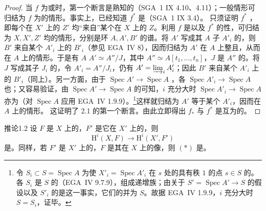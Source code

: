 \begin{proof}
当 $f$ 为或时，第一个断言是熟知的（SGA~1 IX 4.10、4.11）；一般情形可归结为 $f$ 为的情形。事实上，已经知道 $f^*$ 是（SGA~1 IX 3.4）。
只须证明 $f^*$ ，即每个在 $X'$ 上的 $Z'$ 均“来自”某个在 $X$ 上的 $Z$。利用 $f$ 是以及 $f^*$ 的性，可归结为 $X,X',Z'$ 均的情形，分别是环 $A,A',B'$ 的谱。将 $A'$ 写成其 $A$ 子 $A'_i$ 的，则 $B'$ 来自某个 $A'_i$ 上的 $B'_i$（参见 EGA~IV 8），因而归结为 $A'$ 在 $A$ 上整且，从而在 $A$ 上的情形。于是有 $A$  $A'\simeq A''/J$，其中 $A''\simeq A[t_1,\ldots,t_n]$，$J$ 是 $A''$ 的。将 $J$ 写成其子 $J_i$ 的，令 $A'_i=A''/J_i$，仍有 $A'=\varinjlim_i A'_i$；因此 $B'$ 来自某个 $A'_i$ 上的 $B'_i$（同上）。另一方面，由于 $\operatorname{Spec}A'\to\operatorname{Spec}A$ ，各 $\operatorname{Spec}A'_i\to\operatorname{Spec}A$ 也；又容易验证，由 $\operatorname{Spec}A'\to\operatorname{Spec}A$ 的可知，$i$ 充分大时 $\operatorname{Spec}A'_i\to\operatorname{Spec}A$ 亦为（对 $\operatorname{Spec}A$ 应用 EGA~IV 1.9.9）。\footnote{令 $S_i\subset S=\operatorname{Spec}A$ 为使 $X'_i=\operatorname{Spec}A'_i$ 在 $s$ 处的具有秩 $1$ 的点 $s\in S$ 的。各 $S_i$ 是 $S$ 的（EGA~IV 9.7.9），组成递增族；由关于 $S'=\operatorname{Spec}A'\to S$ 的假设以及 $S'_i$ 的是这一事实，它们的并为 $S$。故据 EGA~IV 1.9.9，$i$ 充分大时 $S=S_i$，证毕。}这样就归结为 $A'$ 等于某个 $A'_i$，因而在 $A$ 上的情形。
这证明了 2.1 的第一个断言。由此立即得出 $f_*$ 与 $f^*$ 是互为的。
\end{proof}
\begin{SGAresult}{推论}{1.2}
设 $F$ 是 $X$ 上的，$F'$ 是它在 $X'$ 上的，则
\[\mathrm H^i(X,F)\longrightarrow\mathrm H^i(X',F')\tag{*}\]
是。同样，若 $F'$ 是 $X'$ 上的，$F$ 是其在 $X$ 上的像，则 $(*)$ 是。
\end{SGAresult}
